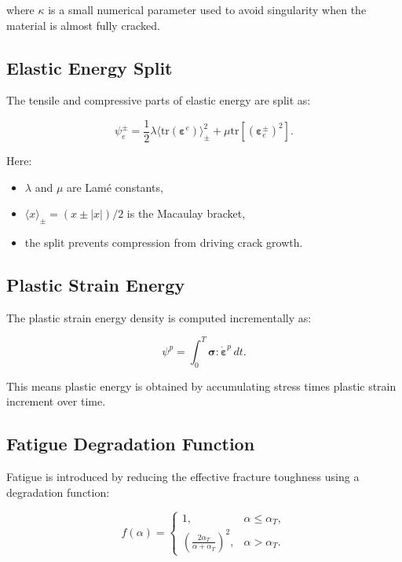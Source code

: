 \documentclass[11pt,a4paper]{article}
\begin{document}
where $\kappa$ is a small numerical parameter used to avoid singularity when the material is almost fully cracked.

\subsection{Elastic Energy Split}

The tensile and compressive parts of elastic energy are split as:

\begin{equation}
\psi_e^{\pm}
=
\frac{1}{2}\lambda \langle \text{tr}(\bm{\varepsilon}^e) \rangle_{\pm}^2
+
\mu \text{tr}
\left[
(\bm{\varepsilon}_e^{\pm})^2
\right].
\end{equation}

Here:

\begin{itemize}
    \item $\lambda$ and $\mu$ are Lam\'e constants,
    \item $\langle x \rangle_{\pm} = (x \pm |x|)/2$ is the Macaulay bracket,
    \item the split prevents compression from driving crack growth.
\end{itemize}

\subsection{Plastic Strain Energy}

The plastic strain energy density is computed incrementally as:

\begin{equation}
\psi^p =
\int_0^T
\bm{\sigma} : \dot{\bm{\varepsilon}}^p \, dt .
\end{equation}

This means plastic energy is obtained by accumulating stress times plastic strain increment over time.

\subsection{Fatigue Degradation Function}

Fatigue is introduced by reducing the effective fracture toughness using a degradation function:

\begin{equation}
f(\alpha)
=
\begin{cases}
1, & \alpha \leq \alpha_T,\\[4pt]
\left(
\frac{2\alpha_T}{\alpha+\alpha_T}
\right)^2, & \alpha > \alpha_T .
\end{cases}
\end{equation}
\end{document}
